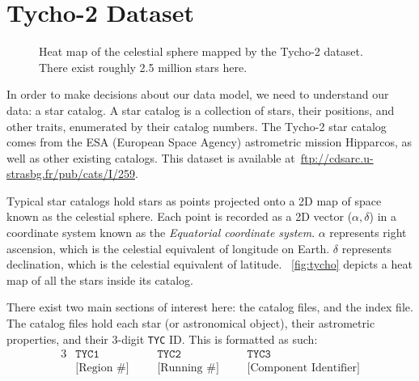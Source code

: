 \section{Tycho-2 Dataset}\label{sec:tycho-2Dataset}
\begin{figure}
    \caption{Heat map of the celestial sphere mapped by the Tycho-2 dataset.
    There exist roughly 2.5 million stars here.}\label{fig:tycho}
\end{figure}

In order to make decisions about our data model, we need to understand our data: a star catalog.
A star catalog is a collection of stars, their positions, and other traits, enumerated by their catalog numbers.
The Tycho-2 star catalog comes from the ESA (European Space Agency) astrometric mission Hipparcos, as well as other
existing catalogs.
This dataset is available at~\url{ftp://cdsarc.u-strasbg.fr/pub/cats/I/259}.

Typical star catalogs hold stars as points projected onto a 2D map of space known as the celestial sphere.
Each point is recorded as a 2D vector ($\alpha, \delta$) in a coordinate system known as the \textit{Equatorial
coordinate system}.
$\alpha$ represents right ascension, which is the celestial equivalent of longitude on Earth.
$\delta$ represents declination, which is the celestial equivalent of latitude.
~\autoref{fig:tycho} depicts a heat map of all the stars inside its catalog.

There exist two main sections of interest here: the catalog files, and the index file.
The catalog files hold each star (or astronomical object), their astrometric properties, and their 3-digit \texttt{TYC}
ID\@.
This is formatted as such:
\begin{alignat*}{3}
    &\texttt{TYC1} &&\texttt{TYC2} &&\texttt{TYC3} \\
    &\text{[Region \#]} \ \ \ \ &&\text{[Running \#]} \ \ \ \ &&\text{[Component Identifier]}
\end{alignat*}

